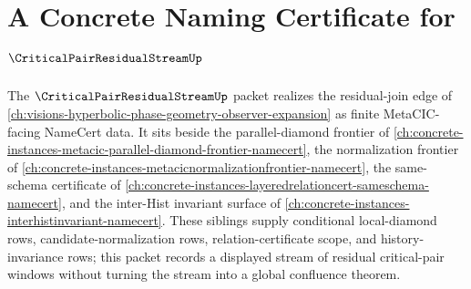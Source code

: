 \chapter{A Concrete Naming Certificate for $\CriticalPairResidualStreamUp$}
\label{ch:concrete-instances-critical-pair-residual-stream-namecert}

The $\CriticalPairResidualStreamUp$ packet realizes the residual-join edge of \autoref{ch:visions-hyperbolic-phase-geometry-observer-expansion} as finite MetaCIC-facing NameCert data. It sits beside the parallel-diamond frontier of \autoref{ch:concrete-instances-metacic-parallel-diamond-frontier-namecert}, the normalization frontier of \autoref{ch:concrete-instances-metacicnormalizationfrontier-namecert}, the same-schema certificate of \autoref{ch:concrete-instances-layeredrelationcert-sameschema-namecert}, and the inter-Hist invariant surface of \autoref{ch:concrete-instances-interhistinvariant-namecert}. These siblings supply conditional local-diamond rows, candidate-normalization rows, relation-certificate scope, and history-invariance rows; this packet records a displayed stream of residual critical-pair windows without turning the stream into a global confluence theorem.

